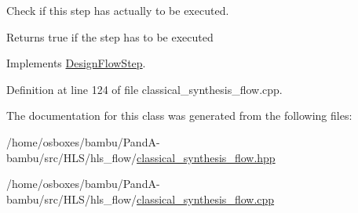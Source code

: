 Check if this step has actually to be executed. 

\begin{DoxyReturn}{Returns}
true if the step has to be executed 
\end{DoxyReturn}


Implements \hyperlink{classDesignFlowStep_a1783abe0c1d162a52da1e413d5d1ef05}{Design\+Flow\+Step}.



Definition at line 124 of file classical\+\_\+synthesis\+\_\+flow.\+cpp.



The documentation for this class was generated from the following files\+:\begin{DoxyCompactItemize}
\item 
/home/osboxes/bambu/\+Pand\+A-\/bambu/src/\+H\+L\+S/hls\+\_\+flow/\hyperlink{classical__synthesis__flow_8hpp}{classical\+\_\+synthesis\+\_\+flow.\+hpp}\item 
/home/osboxes/bambu/\+Pand\+A-\/bambu/src/\+H\+L\+S/hls\+\_\+flow/\hyperlink{classical__synthesis__flow_8cpp}{classical\+\_\+synthesis\+\_\+flow.\+cpp}\end{DoxyCompactItemize}
